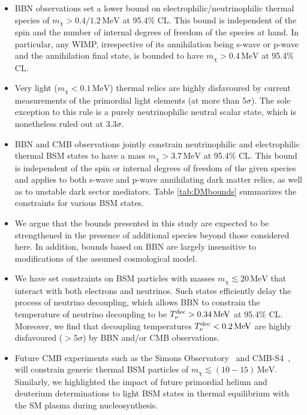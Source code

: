 \documentclass[notitlepage,letterpaper,natbib,aps,prd,onecolumn,amsmath,amsfonts,nofootinbib,preprintnumbers,superscriptaddress,secnumarabic,groupedaddress]{revtex4-1}
\begin{document}
\begin{itemize}[leftmargin=0.6cm,itemsep=1pt] 
\item BBN observations set a lower bound on electrophilic/neutrinophilic thermal species of $m_\chi > 0.4/1.2 \,\text{MeV}$ at 95.4\% CL. This bound is independent of the spin and the number of internal degrees of freedom of the species at hand. In particular, any WIMP, irrespective of its annihilation being s-wave or p-wave and the annihilation final state, is bounded to have $m_\chi > 0.4\,\text{MeV}$ at 95.4\% CL.


\item Very light ($m_\chi < 0.1\,\text{MeV}$) thermal relics are highly disfavoured by current measurements of the primordial light elements (at more than $5\sigma$). The sole exception to this rule is a purely neutrinophilic neutral scalar state, which is nonetheless ruled out at $3.3\sigma$. 

\item BBN and CMB observations jointly constrain neutrinophilic and electrophilic thermal BSM states to have a mass $m_\chi > 3.7\,\text{MeV}$ at 95.4\% CL. This bound is independent of the spin or internal degrees of freedom of the given species and applies to both s-wave and p-wave annihilating dark matter relics, as well as to unstable dark sector mediators. Table \ref{tab:DMbounds} summarizes the constraints for various BSM states.

\item We argue that the bounds presented in this study are expected to be strengthened in the presence of additional species beyond those considered here. In addition, bounds based on BBN are largely insensitive to modifications of the assumed cosmological model.

\item We have set constraints on BSM particles with masses $m_\chi \lesssim 20 \,\text{MeV}$ that interact with both electrons and neutrinos. Such states efficiently delay the process of neutrino decoupling, which allows BBN to constrain the temperature of neutrino decoupling to be $T_{\nu} ^{\rm dec} > 0.34\,\text{MeV}$ at 95.4\% CL. Moreover, we find that decoupling temperatures $T_{\nu} ^{\rm dec} < 0.2 \,\text{MeV}$ are highly disfavoured ($> 5\sigma$) by BBN and/or CMB observations.

\item Future CMB experiments such as the Simons Observatory~\cite{Ade:2018sbj} and CMB-S4~\cite{Abazajian:2016yjj,Abazajian:2019eic}, will constrain generic thermal BSM particles of $m_\chi \lesssim (10-15)\,\text{MeV}$. Similarly, we highlighted the impact of future primordial helium and deuterium determinations to light BSM states in thermal equilibrium with the SM plasma during nucleosynthesis. 
\end{itemize}
\end{document}
